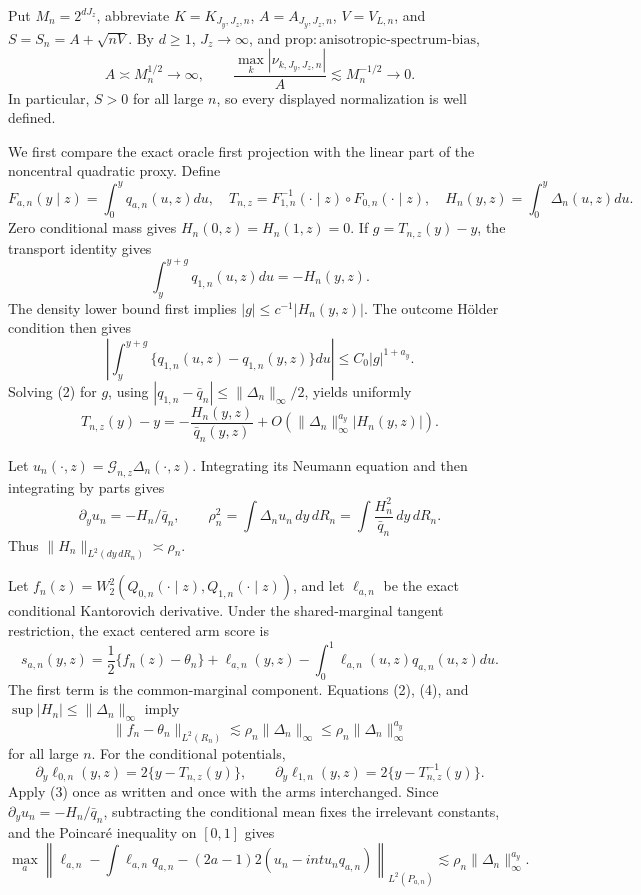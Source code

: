 Put \(M_n=2^{dJ_z}\), abbreviate \(K=K_{J_y,J_z,n}\), \(A=A_{J_y,J_z,n}\), \(V=V_{L,n}\), and \(S=S_n=A+\sqrt{nV}\). By \(d\ge1\), \(J_z\to\infty\), and \(\mathrm{prop{:}anisotropic\text{-}spectrum\text{-}bias}\),
\[
A\asymp M_n^{1/2}\longrightarrow\infty,
\qquad
\frac{\max_k|\nu_{k,J_y,J_z,n}|}{A}
\lesssim M_n^{-1/2}\longrightarrow0.                            \tag{1}
\]
In particular, \(S>0\) for all large \(n\), so every displayed normalization is well defined.

We first compare the exact oracle first projection with the linear part of the noncentral quadratic proxy. Define
\[
F_{a,n}(y\mid z)=\int_0^yq_{a,n}(u,z)du,
\quad T_{n,z}=F_{1,n}^{-1}(\cdot\mid z)\circ F_{0,n}(\cdot\mid z),
\quad H_n(y,z)=\int_0^y\Delta_n(u,z)du.
\]
Zero conditional mass gives \(H_n(0,z)=H_n(1,z)=0\). If \(g=T_{n,z}(y)-y\), the transport identity gives
\[
\int_y^{y+g}q_{1,n}(u,z)du=-H_n(y,z).                            \tag{2}
\]
The density lower bound first implies \(|g|\le c^{-1}|H_n(y,z)|\). The outcome H\"older condition then gives
\[
\left|\int_y^{y+g}\{q_{1,n}(u,z)-q_{1,n}(y,z)\}du\right|
\le C_0|g|^{1+a_y}.
\]
Solving (2) for \(g\), using \(|q_{1,n}-\bar q_n|\le\|\Delta_n\|_\infty/2\), yields uniformly
\[
T_{n,z}(y)-y
=-\frac{H_n(y,z)}{\bar q_n(y,z)}
+O\!\left(\|\Delta_n\|_\infty^{a_y}|H_n(y,z)|\right).          \tag{3}
\]

Let \(u_n(\cdot,z)=\mathcal G_{n,z}\Delta_n(\cdot,z)\). Integrating its Neumann equation and then integrating by parts gives
\[
\partial_yu_n=-H_n/\bar q_n,
\qquad
\rho_n^2=\int\Delta_nu_n\,dy\,dR_n
=\int\frac{H_n^2}{\bar q_n}\,dy\,dR_n.                         \tag{4}
\]
Thus \(\|H_n\|_{L^2(dy\,dR_n)}\asymp\rho_n\).

Let \(f_n(z)=W_2^2(Q_{0,n}(\cdot\mid z),Q_{1,n}(\cdot\mid z))\), and let \(\ell_{a,n}\) be the exact conditional Kantorovich derivative. Under the shared-marginal tangent restriction, the exact centered arm score is
\[
s_{a,n}(y,z)
=\frac12\{f_n(z)-\theta_n\}
+\ell_{a,n}(y,z)-\int_0^1\ell_{a,n}(u,z)q_{a,n}(u,z)du.          \tag{5}
\]
The first term is the common-marginal component. Equations (2), (4), and \(\sup|H_n|\le\|\Delta_n\|_\infty\) imply
\[
\|f_n-\theta_n\|_{L^2(R_n)}
\lesssim\rho_n\|\Delta_n\|_\infty
\le\rho_n\|\Delta_n\|_\infty^{a_y}                           \tag{6}
\]
for all large \(n\). For the conditional potentials,
\[
\partial_y\ell_{0,n}(y,z)=2\{y-T_{n,z}(y)\},
\qquad
\partial_y\ell_{1,n}(y,z)=2\{y-T_{n,z}^{-1}(y)\}.
\]
Apply (3) once as written and once with the arms interchanged. Since \(\partial_yu_n=-H_n/\bar q_n\), subtracting the conditional mean fixes the irrelevant constants, and the Poincar\'e inequality on \([0,1]\) gives
\[
\max_a\left\|
\ell_{a,n}-\int\ell_{a,n}q_{a,n}
-(2a-1)2\left(u_n-int u_nq_{a,n}\right)
\right\|_{L^2(P_{a,n})}
\lesssim\rho_n\|\Delta_n\|_\infty^{a_y}.                      \tag{7}
\]

